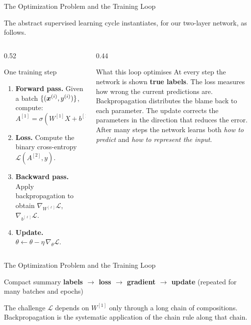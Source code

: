 \documentclass[11pt,aspectratio=169,professionalfonts]{beamer}
\begin{document}
\begin{frame}{The Optimization Problem and the Training Loop}
 
The abstract supervised learning cycle instantiates, for our two-layer network, as follows.
 
\bigskip
 
\begin{columns}[T]
\small 
\begin{column}{0.52\textwidth}
\begin{block}{One training step}
\begin{enumerate}
  \item \textbf{Forward pass.} Given a batch $\{(\bm{x}^{(i)}, y^{(i)})\}$, compute:
  \[
    A^{[1]} = \sigma(W^{[1]}X + b^{[1]}), \quad
    A^{[2]} = \sigma(W^{[2]}A^{[1]} + b^{[2]}).
  \]
  \item \textbf{Loss.} Compute the binary cross-entropy $\mathcal{L}(A^{[2]}, y)$.
  \item \textbf{Backward pass.} Apply backpropagation to obtain $\nabla_{W^{[\ell]}}\mathcal{L}$, $\nabla_{b^{[\ell]}}\mathcal{L}$.
  \item \textbf{Update.} $\theta \leftarrow \theta - \eta\,\nabla_\theta \mathcal{L}$.
\end{enumerate}
\end{block}
\end{column}
 
\begin{column}{0.44\textwidth}
\begin{alertblock}{What this loop optimises}
At every step the network is shown \textbf{true labels}. The loss measures how wrong the current predictions are.\\[6pt]
Backpropagation distributes the blame back to each parameter. The update corrects the parameters in the direction that reduces the error.\\[6pt]
After many steps the network learns both \emph{how to predict} and \emph{how to represent the input}.
\end{alertblock}
\end{column}
 
\end{columns}
\end{frame}
%
%
\begin{frame}{The Optimization Problem and the Training Loop}

\begin{block}{Compact summary}
\centering
\textbf{labels $\to$ loss $\to$ gradient $\to$ update} \quad (repeated for many batches and epochs)
\end{block}
\vspace{1cm}
\begin{alertblock}{The challenge}
$\mathcal{L}$ depends on $W^{[1]}$ only through a long chain of compositions.
Backpropagation is the systematic application of the chain rule along that chain.
\end{alertblock}
\end{frame}
\end{document}
